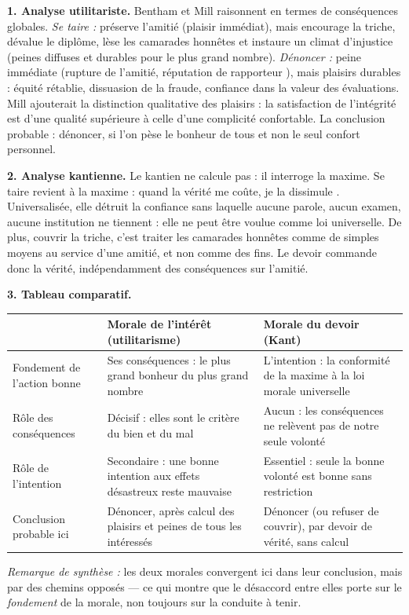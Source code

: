 \documentclass[11pt]{article}
\begin{document}
\begin{corrige}

\textbf{1. Analyse utilitariste.} Bentham et Mill raisonnent en termes de conséquences globales. \emph{Se taire :} préserve l'amitié (plaisir immédiat), mais encourage la triche, dévalue le diplôme, lèse les camarades honnêtes et instaure un climat d'injustice (peines diffuses et durables pour le plus grand nombre). \emph{Dénoncer :} peine immédiate (rupture de l'amitié, réputation de \guillemotleft rapporteur \guillemotright), mais plaisirs durables : équité rétablie, dissuasion de la fraude, confiance dans la valeur des évaluations. Mill ajouterait la distinction qualitative des plaisirs : la satisfaction de l'intégrité est d'une qualité supérieure à celle d'une complicité confortable. La conclusion probable : dénoncer, si l'on pèse le bonheur de tous et non le seul confort personnel.

\textbf{2. Analyse kantienne.} Le kantien ne calcule pas : il interroge la maxime. Se taire revient à la maxime : \guillemotleft quand la vérité me coûte, je la dissimule \guillemotright. Universalisée, elle détruit la confiance sans laquelle aucune parole, aucun examen, aucune institution ne tiennent : elle ne peut être voulue comme loi universelle. De plus, couvrir la triche, c'est traiter les camarades honnêtes comme de simples moyens au service d'une amitié, et non comme des fins. Le devoir commande donc la vérité, indépendamment des conséquences sur l'amitié.

\textbf{3. Tableau comparatif.}

\begin{center}
\begin{tabularx}{\linewidth}{|l|X|X|}
\hline
\rowcolor{popblueL} & \textbf{Morale de l'intérêt (utilitarisme)} & \textbf{Morale du devoir (Kant)} \\
\hline
Fondement de l'action bonne & Ses conséquences : le plus grand bonheur du plus grand nombre & L'intention : la conformité de la maxime à la loi morale universelle \\
\hline
Rôle des conséquences & Décisif : elles sont le critère du bien et du mal & Aucun : les conséquences ne relèvent pas de notre seule volonté \\
\hline
Rôle de l'intention & Secondaire : une bonne intention aux effets désastreux reste mauvaise & Essentiel : seule la bonne volonté est bonne sans restriction \\
\hline
Conclusion probable ici & Dénoncer, après calcul des plaisirs et peines de tous les intéressés & Dénoncer (ou refuser de couvrir), par devoir de vérité, sans calcul \\
\hline
\end{tabularx}
\end{center}

\emph{Remarque de synthèse :} les deux morales convergent ici dans leur conclusion, mais par des chemins opposés — ce qui montre que le désaccord entre elles porte sur le \emph{fondement} de la morale, non toujours sur la conduite à tenir.
\end{corrige}
\end{document}
